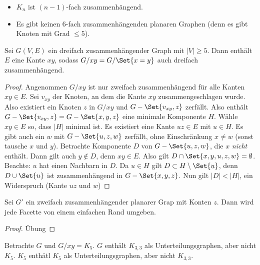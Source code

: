 
\begin{nt}
    \begin{itemize}
        \item
            $K_n$ ist $(n-1)$-fach zusammenhängend.
        \item
            Es gibt keinen $6$-fach zusammenhängenden planaren Graphen (denn es gibt Knoten mit Grad $\le 5$).
    \end{itemize}
\end{nt}

\begin{st}[Thomassen, 1980]
    Sei $G(V, E)$ ein dreifach zusammenhängender Graph mit $|V| \ge 5$.
    Dann enthält $E$ eine Kante $xy$, sodass $G / xy = G / \Set{x=y}$ auch dreifach zusammenhängend.
    \begin{proof}
        Angenommen $G / xy$ ist nur zweifach zusammenhängend für alle Kanten $xy \in E$.
        Sei $v_{xy}$ der Knoten, an dem die Kante $xy$ zusammengeschlagen wurde.
        Also existiert ein Knoten $z$ in $G / xy$ und $G - \Set{v_{xy}, z}$ zerfällt.
        Also enthält $G - \Set{v_{xy}, z} = G - \Set{x,y,z}$ eine minimale Komponente $H$.
        Wähle $xy \in E$ so, dass $|H|$ minimal ist.
        Es existiert eine Kante $uz \in E$ mit $u \in H$.
        Es gibt auch ein $w$ mit $G - \Set{u,z,w}$ zerfällt, ohne Einschränkung $x \neq w$ (sonst tausche $x$ und $y$).
        Betrachte Komponente $D$ von $G - \Set{u,z,w}$, die $x$ \emph{nicht} enthält.
        Dann gilt auch $y \not\in D$, denn $xy \in E$.
        Also gilt $D \cap \Set{x,y,u,z,w} = \emptyset$.
        Beachte: $u$ hat einen Nachbarn in $D$.
        Da $u \in H$ gilt $D \subset H \setminus \Set{u}$, denn $D \cup \Set{u}$ ist zusammenhängend in $G - \Set{x,y,z}$.
        Nun gilt $|D| < |H|$, ein Widerspruch (Kante $uz$ und $w$)
    \end{proof}
\end{st}

\begin{lem}
    Sei $G'$ ein zweifach zusammenhängender planarer Grap mit Konten $z$.
    Dann wird jede Facette von einem einfachen Rand umgeben.
    \begin{proof}
        Übung
    \end{proof}
\end{lem}

\begin{ex}
    Betrachte $G$ und $G / xy = K_5$.
    $G$ enthält $K_{3,3}$ als Unterteilungsgraphen, aber nicht $K_5$.
    $K_5$ enthätl $K_5$ als Unterteilungsgraphen, aber nicht $K_{3,3}$.
\end{ex}

